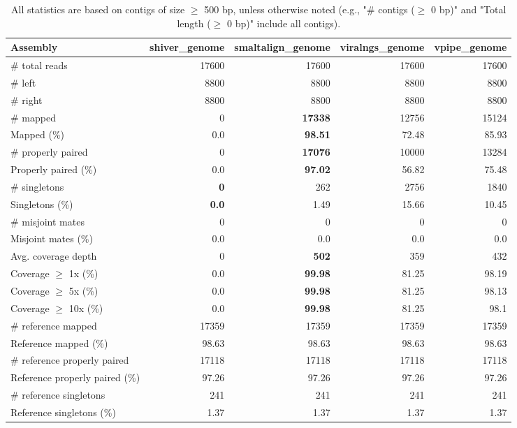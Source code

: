\documentclass[12pt,a4paper]{article}
\begin{document}
\begin{table}[ht]
\begin{center}
\caption{All statistics are based on contigs of size $\geq$ 500 bp, unless otherwise noted (e.g., "\# contigs ($\geq$ 0 bp)" and "Total length ($\geq$ 0 bp)" include all contigs).}
\begin{tabular}{|l*{4}{|r}|}
\hline
Assembly & shiver\_genome & smaltalign\_genome & viralngs\_genome & vpipe\_genome \\ \hline
\# total reads & 17600 & 17600 & 17600 & 17600 \\ \hline
\# left & 8800 & 8800 & 8800 & 8800 \\ \hline
\# right & 8800 & 8800 & 8800 & 8800 \\ \hline
\# mapped & 0 & {\bf 17338} & 12756 & 15124 \\ \hline
Mapped (\%) & 0.0 & {\bf 98.51} & 72.48 & 85.93 \\ \hline
\# properly paired & 0 & {\bf 17076} & 10000 & 13284 \\ \hline
Properly paired (\%) & 0.0 & {\bf 97.02} & 56.82 & 75.48 \\ \hline
\# singletons & {\bf 0} & 262 & 2756 & 1840 \\ \hline
Singletons (\%) & {\bf 0.0} & 1.49 & 15.66 & 10.45 \\ \hline
\# misjoint mates & 0 & 0 & 0 & 0 \\ \hline
Misjoint mates (\%) & 0.0 & 0.0 & 0.0 & 0.0 \\ \hline
Avg. coverage depth & 0 & {\bf 502} & 359 & 432 \\ \hline
Coverage $\geq$ 1x (\%) & 0.0 & {\bf 99.98} & 81.25 & 98.19 \\ \hline
Coverage $\geq$ 5x (\%) & 0.0 & {\bf 99.98} & 81.25 & 98.13 \\ \hline
Coverage $\geq$ 10x (\%) & 0.0 & {\bf 99.98} & 81.25 & 98.1 \\ \hline
\# reference mapped & 17359 & 17359 & 17359 & 17359 \\ \hline
Reference mapped (\%) & 98.63 & 98.63 & 98.63 & 98.63 \\ \hline
\# reference properly paired & 17118 & 17118 & 17118 & 17118 \\ \hline
Reference properly paired (\%) & 97.26 & 97.26 & 97.26 & 97.26 \\ \hline
\# reference singletons & 241 & 241 & 241 & 241 \\ \hline
Reference singletons (\%) & 1.37 & 1.37 & 1.37 & 1.37 \\ \hline

\end{tabular}
\end{center}
\end{table}
\end{document}

